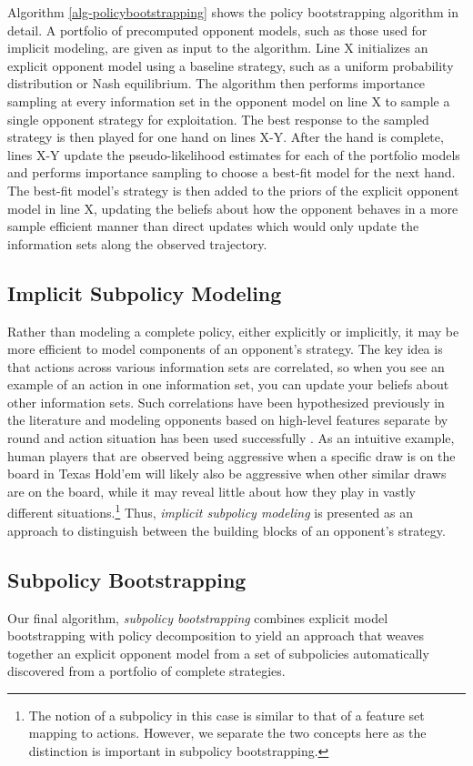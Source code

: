 \documentclass{aamas2013}
\begin{document}
    Algorithm \ref{alg-policybootstrapping} shows the policy bootstrapping algorithm in detail. A portfolio of precomputed opponent models, such as those used for implicit modeling, are given as input to the algorithm. Line X initializes an explicit opponent model using a baseline strategy, such as a uniform probability distribution or Nash equilibrium. The algorithm then performs importance sampling at every information set in the opponent model on line X to sample a single opponent strategy for exploitation. The best response to the sampled strategy is then played for one hand on lines X-Y. After the hand is complete, lines X-Y update the pseudo-likelihood estimates for each of the portfolio models and performs importance sampling to choose a best-fit model for the next hand. The best-fit model's strategy is then added to the priors of the explicit opponent model in line X, updating the beliefs about how the opponent behaves in a more sample efficient manner than direct updates which would only update the information sets along the observed trajectory.

    \subsection{Implicit Subpolicy Modeling}
    Rather than modeling a complete policy, either explicitly or implicitly, it may be more efficient to model components of an opponent's strategy. The key idea is that actions across various information sets are correlated, so when you see an example of an action in one information set, you can update your beliefs about other information sets. Such correlations have been hypothesized previously in the literature \cite{bayesbluff,shortterm} and modeling opponents based on high-level features separate by round and action situation has been used successfully \cite{ponsen2009evolutionary}. As an intuitive example, human players that are observed being aggressive when a specific draw is on the board in Texas Hold'em will likely also be aggressive when other similar draws are on the board, while it may reveal little about how they play in vastly different situations.\footnote{The notion of a subpolicy in this case is similar to that of a feature set mapping to actions. However, we separate the two concepts here as the distinction is important in subpolicy bootstrapping.} Thus, \textit{implicit subpolicy modeling} is presented as an approach to distinguish between the building blocks of an opponent's strategy.

    \subsection{Subpolicy Bootstrapping}
    Our final algorithm, \textit{subpolicy bootstrapping} combines explicit model bootstrapping with policy decomposition to yield an approach that weaves together an explicit opponent model from a set of subpolicies automatically discovered from a portfolio of complete strategies.
\end{document}
